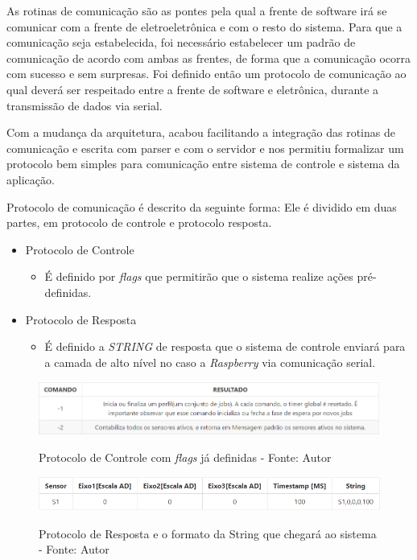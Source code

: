 As rotinas de comunicação são as pontes pela qual a frente de software irá se comunicar com a frente de eletroeletrônica e com o resto do sistema. 
Para que a comunicação seja estabelecida, foi necessário estabelecer um padrão de comunicação de acordo com ambas as frentes, de forma que a comunicação 
ocorra com sucesso e sem surpresas. Foi definido então um protocolo de comunicação ao qual deverá ser respeitado entre a frente de software e eletrônica, 
durante a transmissão de dados via serial.

Com a mudança da arquitetura, acabou facilitando a integração das rotinas de comunicação e escrita com parser e com o servidor e nos permitiu formalizar 
um protocolo bem simples para comunicação entre sistema de controle e sistema da aplicação.

Protocolo de comunicação é descrito da seguinte forma: Ele é dividido em duas partes, em protocolo de controle e protocolo resposta.

\begin{itemize}
    \item Protocolo de Controle
    \begin{itemize}
        \item É definido por \textit{flags} que permitirão que o sistema realize ações pré-definidas.
    \end{itemize}
    \item Protocolo de Resposta
    \begin{itemize}
        \item É definido a \textit{STRING} de resposta que o sistema de controle enviará para a camada de alto nível no caso a \textit{Raspberry} via 
        comunicação serial.
    \end{itemize}
\end{itemize}

\begin{figure}[H]
\centering
\includegraphics[keepaspectratio=true,scale=0.7]{figuras/protocolo_controle.png}
\label{fig:protocolo_controle}
\caption{Protocolo de Controle com \textit{flags} já definidas - Fonte: Autor}
\end{figure}

\begin{figure}[H]
\centering
\includegraphics[keepaspectratio=true,scale=0.8]{figuras/protocolo_string.png}
\label{fig:protocolo_string}
\caption{Protocolo de Resposta e o formato da String que chegará ao sistema - Fonte: Autor}
\end{figure}

